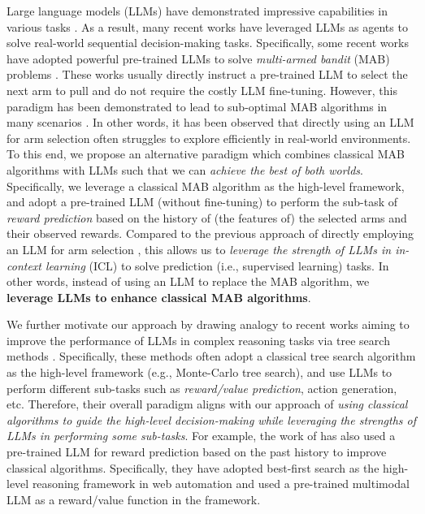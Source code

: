 Large language models (LLMs) have demonstrated impressive capabilities in various tasks \cite{citechatgpt,openai2023gpt4,liu2024deepseek}.
As a result, many recent works have leveraged LLMs as agents to solve real-world sequential decision-making tasks.
Specifically, some recent works have adopted powerful pre-trained LLMs to solve \emph{multi-armed bandit} (MAB) problems \cite{krishnamurthy2024can,chen2024efficient,xia2024beyond,mukherjee2024pretraining}.
These works usually directly instruct a pre-trained LLM to select the next arm to pull and do not require the costly LLM fine-tuning.
However, this paradigm has been demonstrated to lead to sub-optimal MAB algorithms in many scenarios \cite{krishnamurthy2024can}.
In other words, it has been observed that directly using an LLM for arm selection often struggles to explore efficiently in real-world environments.
To this end, we propose an alternative paradigm which
combines classical MAB algorithms with LLMs such that we can \emph{achieve the best of both worlds}.
Specifically, we leverage a classical MAB algorithm as the high-level framework, and adopt a pre-trained LLM (without fine-tuning) to perform the sub-task of \emph{reward prediction} based on the history of (the features of) the selected arms and their observed rewards.
Compared to the previous approach of directly employing an LLM for arm selection \cite{krishnamurthy2024can}, this allows us to \emph{leverage the strength of LLMs in in-context learning} (ICL) to solve prediction (i.e., supervised learning) tasks.
In other words, instead of using an LLM to replace the MAB algorithm, we \textbf{leverage LLMs to enhance classical MAB algorithms}.

We further motivate our approach by drawing analogy to
recent works aiming to improve the performance of LLMs in complex reasoning tasks via tree search methods \cite{hao2023reasoning,yao2024tree,zhang2024llama,bi2024forest}.
Specifically, these methods often adopt a classical tree search algorithm as the high-level framework (e.g., Monte-Carlo tree search), and use LLMs to perform different sub-tasks such as \emph{reward/value prediction}, action generation, etc.
Therefore, their overall paradigm aligns with our approach of \emph{using classical algorithms to guide the high-level decision-making while leveraging the strengths of LLMs in performing some sub-tasks}.
For example, the work of \citet{koh2024tree} has also used a pre-trained LLM for reward prediction based on the past history to improve classical algorithms.
Specifically, they have adopted best-first search as the high-level 
reasoning framework 
in web automation and used a pre-trained multimodal LLM as a reward/value function in the framework.

